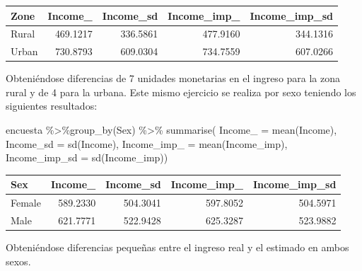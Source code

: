 \documentclass[
  12pt,
]{book}
\newenvironment{Shaded}{\begin{snugshade}}{\end{snugshade}}
\newcommand{\AttributeTok}[1]{\textcolor[rgb]{0.77,0.63,0.00}{#1}}
\newcommand{\FunctionTok}[1]{\textcolor[rgb]{0.00,0.00,0.00}{#1}}
\newcommand{\NormalTok}[1]{#1}
\newcommand{\SpecialCharTok}[1]{\textcolor[rgb]{0.00,0.00,0.00}{#1}}
\begin{document}
\begin{tabular}{l|r|r|r|r}
\hline
Zone & Income\_ & Income\_sd & Income\_imp\_ & Income\_imp\_sd\\
\hline
Rural & 469.1217 & 336.5861 & 477.9160 & 344.1316\\
\hline
Urban & 730.8793 & 609.0304 & 734.7559 & 607.0266\\
\hline
\end{tabular}

Obteniéndose diferencias de 7 unidades monetarias en el ingreso para la zona rural y de 4 para la urbana. Este mismo ejercicio se realiza por sexo teniendo los siguientes resultados:

\begin{Shaded}
\begin{Highlighting}[]
\NormalTok{encuesta }\SpecialCharTok{\%\textgreater{}\%}\FunctionTok{group\_by}\NormalTok{(Sex) }\SpecialCharTok{\%\textgreater{}\%}  \FunctionTok{summarise}\NormalTok{(}
  \AttributeTok{Income\_ =} \FunctionTok{mean}\NormalTok{(Income),}
  \AttributeTok{Income\_sd =} \FunctionTok{sd}\NormalTok{(Income),}
  \AttributeTok{Income\_imp\_ =} \FunctionTok{mean}\NormalTok{(Income\_imp),}
  \AttributeTok{Income\_imp\_sd =} \FunctionTok{sd}\NormalTok{(Income\_imp))}
\end{Highlighting}
\end{Shaded}

\begin{tabular}{l|r|r|r|r}
\hline
Sex & Income\_ & Income\_sd & Income\_imp\_ & Income\_imp\_sd\\
\hline
Female & 589.2330 & 504.3041 & 597.8052 & 504.5971\\
\hline
Male & 621.7771 & 522.9428 & 625.3287 & 523.9882\\
\hline
\end{tabular}

Obteniéndose diferencias pequeñas entre el ingreso real y el estimado en ambos sexos.
\end{document}
